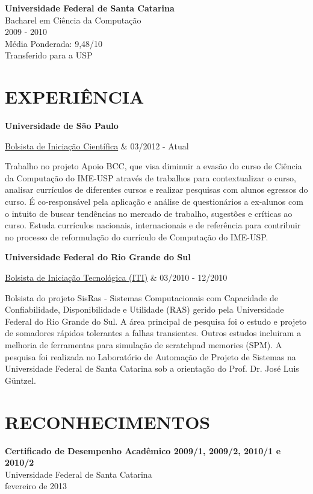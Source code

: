 \documentclass[margin=<value>,11pt]{res} %
\begin{document}
\begin{resume}
	{\bf Universidade Federal de Santa Catarina}\\
	Bacharel em Ciência da Computação \\
	2009 - 2010 \\
	Média Ponderada: 9,48/10 \\
	Transferido para a USP \\

\vfill
\section{EXPERIÊNCIA}
	{\bf Universidade de São Paulo} \\
		\begin{ncolumn}{2} %
		\underline{Bolsista de Iniciação Científica}     &      03/2012 - Atual
		\end{ncolumn}
		Trabalho no projeto Apoio BCC, que visa diminuir a evasão do curso de Ciência da Computação do IME-USP através de trabalhos para contextualizar o curso, analisar currículos de diferentes cursos e realizar pesquisas com alunos egressos do curso. É co-responsável pela aplicação e análise de questionários a ex-alunos com o intuito de buscar tendências no mercado de trabalho, sugestões e críticas ao curso. Estuda currículos nacionais, internacionais e de referência para contribuir no processo de reformulação do currículo de Computação do IME-USP.

	{\bf Universidade Federal do Rio Grande do Sul} \\
		\begin{ncolumn}{2} %
		\underline{Bolsista de Iniciação Tecnológica (ITI)}     &      03/2010 - 12/2010
		\end{ncolumn}
		Bolsista do projeto SisRas - Sistemas Computacionais com Capacidade de Confiabilidade, Disponibilidade e Utilidade (RAS) gerido pela Universidade Federal do Rio Grande do Sul. A área principal de pesquisa foi o estudo e projeto de somadores rápidos tolerantes a falhas transientes. Outros estudos incluiram a melhoria de ferramentas para simulação de scratchpad memories (SPM). A pesquisa foi realizada no Laboratório de Automação de Projeto de Sistemas na Universidade Federal de Santa Catarina sob a orientação do Prof. Dr. José Luis Güntzel.
 
 
\section{RECONHECIMENTOS}
	{\bf Certificado de Desempenho Acadêmico 2009/1, 2009/2, 2010/1 e 2010/2}\\
	Universidade Federal de Santa Catarina\\
	fevereiro de 2013


\end{resume}
\end{document}
